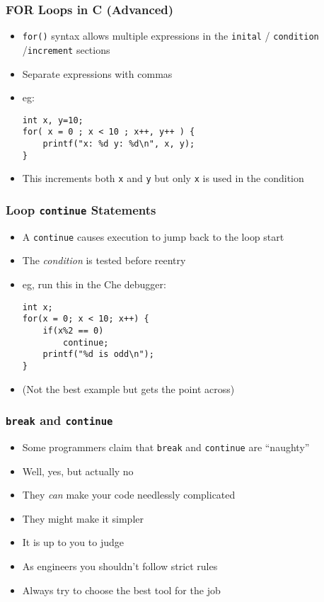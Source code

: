 \documentclass[14pt]{beamer}
\begin{document}
\begin{frame}[fragile]
\frametitle{FOR Loops in C (Advanced)}
\begin{itemize}
\item \texttt{for()} syntax allows multiple expressions in the \texttt{inital} / \texttt{condition} /\texttt{increment} sections
\item Separate expressions with commas
\item eg:
\begin{lstlisting}[style=CStyle]
int x, y=10;
for( x = 0 ; x < 10 ; x++, y++ ) {
	printf("x: %d y: %d\n", x, y);
}
\end{lstlisting}
\item This increments both \texttt{x} and \texttt{y} but only \texttt{x} is used in the condition
\end{itemize}
\end{frame}

\begin{frame}[fragile]
\frametitle{Loop \texttt{continue} Statements}
\begin{itemize}
	\item A \texttt{continue} causes execution to jump back to the loop start
	\item The \textit{condition} is tested before reentry	
	\item eg, run this in the Che debugger:
	\begin{lstlisting}[style=CStyle]
int x;
for(x = 0; x < 10; x++) {
	if(x%2 == 0)
		continue;
	printf("%d is odd\n");
}
\end{lstlisting}
\item {\small(Not the best example but gets the point across)}
\end{itemize}
\end{frame}

\begin{frame}
\frametitle{\texttt{break} and \texttt{continue}}
\begin{itemize}
\item Some programmers claim that \texttt{break} and \texttt{continue} are ``naughty''
\item Well, yes, but actually no
\item They \textit{can} make your code needlessly complicated
\item They might make it simpler
\item It is up to you to judge
\item As engineers you shouldn't follow strict rules
\item Always try to choose the best tool for the job
\end{itemize}
\end{frame}
\end{document}
